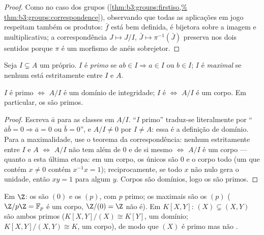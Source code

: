 \begin{proof}
Como no caso dos grupos (\cref{thm:b3:groups:firstiso,%
thm:b3:groups:correspondence}), observando que todas as aplicações em
jogo respeitam também os produtos: $\bar f$ está bem definida, é
bijetora sobre a imagem e multiplicativa; a correspondência $J \mapsto J/I$, $\bar J \mapsto \pi^{-1}(\bar J)$
preserva  nos dois sentidos porque $\pi$ é um morfismo de
anéis sobrejetor.
\end{proof}

\begin{definition}\label{def:b3:rings:primemaximal}
Seja $I \subsetneq A$ um  próprio. $I$ é \emph{primo}
se $ab \in I \Rightarrow a \in I$ ou $b \in I$; $I$ é \emph{maximal} se
nenhum  está estritamente entre $I$ e $A$.
\end{definition}

\begin{proposition}\label{prop:b3:rings:primemaximal}
$I$ é primo $\iff$ $A/I$ é um domínio de integridade; $I$ é
 $\iff$ $A/I$ é um corpo. Em particular, os  são primos.
\end{proposition}

\begin{proof}
Escreva $\bar a$ para as classes em $A/I$. ``$I$ primo''
traduz-se literalmente por ``$\bar a\bar b = 0 \Rightarrow \bar a = 0$ ou $\bar b
= 0$'', e $A/I \neq 0$ por $I \neq A$: essa é a
definição de domínio. Para a maximalidade, use o teorema da
correspondência: nenhum  estritamente entre $I$ e $A$
$\iff$ $A/I$ não tem  além de $0$ e de si mesmo
$\iff$ $A/I$ é um corpo --- quanto a esta última etapa: em um
corpo, os únicos  são $0$ e o corpo todo (um  que contém
$x \ne 0$ contém $x^{-1}x = 1$); reciprocamente, se todo $x$ não nulo gera o 
unidade, então $xy = 1$ para algum $y$. Corpos são domínios, logo
os  são primos.
\end{proof}

\begin{example}\label{ex:b3:rings:primemaximal}
Em $\Z$: os  são $(0)$ e os $(p)$, com $p$
primo; os maximais são os $(p)$ ($\Z/p\Z = \mathbb F_p$ é um corpo, $\Z/(0) = \Z$ não é). Em
$K[X, Y]$: $(X) \subsetneq (X, Y)$ são ambos primos ($K[X,Y]/(X) \cong K[Y]$, um domínio; $K[X,Y]/(X,Y) \cong K$, um corpo), de modo
que $(X)$ é primo mas não .
\end{example}

